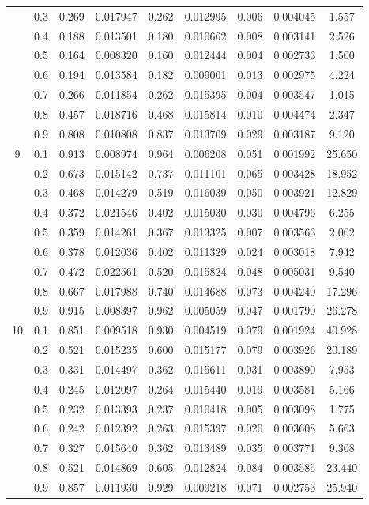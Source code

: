 \begin{longtable}{ | c | c || c | c | c | c | c | c | c | }
 & 0.3 & 0.269 & 0.017947 & 0.262 & 0.012995 & 0.006 & 0.004045 & 1.557 \\
 & 0.4 & 0.188 & 0.013501 & 0.180 & 0.010662 & 0.008 & 0.003141 & 2.526 \\
 & 0.5 & 0.164 & 0.008320 & 0.160 & 0.012444 & 0.004 & 0.002733 & 1.500 \\
 & 0.6 & 0.194 & 0.013584 & 0.182 & 0.009001 & 0.013 & 0.002975 & 4.224 \\
 & 0.7 & 0.266 & 0.011854 & 0.262 & 0.015395 & 0.004 & 0.003547 & 1.015 \\
 & 0.8 & 0.457 & 0.018716 & 0.468 & 0.015814 & 0.010 & 0.004474 & 2.347 \\
 & 0.9 & 0.808 & 0.010808 & 0.837 & 0.013709 & 0.029 & 0.003187 & 9.120 \\
 \hline
\multirow{9}{*}{9} & 0.1 & 0.913 & 0.008974 & 0.964 & 0.006208 & 0.051 & 0.001992 & 25.650 \\
 & 0.2 & 0.673 & 0.015142 & 0.737 & 0.011101 & 0.065 & 0.003428 & 18.952 \\
 & 0.3 & 0.468 & 0.014279 & 0.519 & 0.016039 & 0.050 & 0.003921 & 12.829 \\
 & 0.4 & 0.372 & 0.021546 & 0.402 & 0.015030 & 0.030 & 0.004796 & 6.255 \\
 & 0.5 & 0.359 & 0.014261 & 0.367 & 0.013325 & 0.007 & 0.003563 & 2.002 \\
 & 0.6 & 0.378 & 0.012036 & 0.402 & 0.011329 & 0.024 & 0.003018 & 7.942 \\
 & 0.7 & 0.472 & 0.022561 & 0.520 & 0.015824 & 0.048 & 0.005031 & 9.540 \\
 & 0.8 & 0.667 & 0.017988 & 0.740 & 0.014688 & 0.073 & 0.004240 & 17.296 \\
 & 0.9 & 0.915 & 0.008397 & 0.962 & 0.005059 & 0.047 & 0.001790 & 26.278 \\
 \hline
\multirow{9}{*}{10} & 0.1 & 0.851 & 0.009518 & 0.930 & 0.004519 & 0.079 & 0.001924 & 40.928 \\
 & 0.2 & 0.521 & 0.015235 & 0.600 & 0.015177 & 0.079 & 0.003926 & 20.189 \\
 & 0.3 & 0.331 & 0.014497 & 0.362 & 0.015611 & 0.031 & 0.003890 & 7.953 \\
 & 0.4 & 0.245 & 0.012097 & 0.264 & 0.015440 & 0.019 & 0.003581 & 5.166 \\
 & 0.5 & 0.232 & 0.013393 & 0.237 & 0.010418 & 0.005 & 0.003098 & 1.775 \\
 & 0.6 & 0.242 & 0.012392 & 0.263 & 0.015397 & 0.020 & 0.003608 & 5.663 \\
 & 0.7 & 0.327 & 0.015640 & 0.362 & 0.013489 & 0.035 & 0.003771 & 9.308 \\
 & 0.8 & 0.521 & 0.014869 & 0.605 & 0.012824 & 0.084 & 0.003585 & 23.440 \\
 & 0.9 & 0.857 & 0.011930 & 0.929 & 0.009218 & 0.071 & 0.002753 & 25.940 \\
 \hline
\hline
\end{longtable}
 
